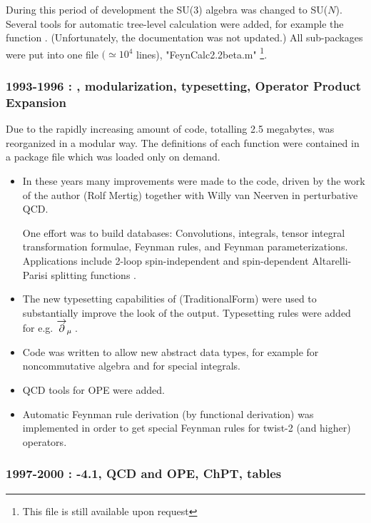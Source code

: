 During this period of development the SU(3) algebra was changed to SU($N$). Several tools for
automatic tree-level calculation were added, for example the function .
(Unfortunately, the  documentation was not updated.) All sub-packages were put into one file
\(\big(\simeq {{10}^4}\) lines), "FeynCalc2.2beta.m" \footnote{This file is still available upon
request}.

\subsubsection*{1993-1996 : , modularization, typesetting, Operator Product Expansion}

Due to the rapidly increasing amount of code, totalling 2.5 megabytes, \fc was
reorganized in a modular way. The definitions of each function were contained in
a package file which was loaded only on demand.

\begin{itemize}

\item
In these years many improvements were made to the code, driven by the work of the author
(Rolf Mertig) together with Willy van Neerven in perturbative QCD.

One effort was to build databases: Convolutions, integrals, tensor integral transformation
formulae, Feynman rules,
and Feynman parameterizations.
Applications include 2-loop spin-independent and spin-dependent Altarelli-Parisi splitting
functions \cite{Altarelli:1977zs}.

\item The new typesetting capabilities of  (TraditionalForm) were used to substantially
improve the look of the output.
Typesetting rules were added for e.g. \({\overvar{\partial }{\rightarrow}}_{\mu } \multsp \).

\item Code was written to allow new abstract data types, for example for noncommutative algebra
and for special integrals.

\item QCD tools for OPE were added.

\item Automatic Feynman rule derivation (by functional
derivation) was implemented in order to get special Feynman rules
for twist-2 (and higher) operators.

\end{itemize}

\subsubsection*{1997-2000 : -4.1, QCD and OPE, ChPT, tables}

